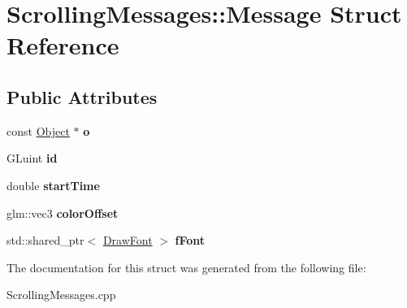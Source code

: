 \hypertarget{structScrollingMessages_1_1Message}{\section{\-Scrolling\-Messages\-:\-:\-Message \-Struct \-Reference}
\label{structScrollingMessages_1_1Message}
}
\subsection*{\-Public \-Attributes}
\begin{DoxyCompactItemize}
\item 
\hypertarget{structScrollingMessages_1_1Message_aba2bac4b6c99d108b603e5d6fc6501a5}{const \hyperlink{classObject}{\-Object} $\ast$ {\bfseries o}}\label{structScrollingMessages_1_1Message_aba2bac4b6c99d108b603e5d6fc6501a5}

\item 
\hypertarget{structScrollingMessages_1_1Message_acc669e5d61877e2be7aebb93e9d015e5}{\-G\-Luint {\bfseries id}}\label{structScrollingMessages_1_1Message_acc669e5d61877e2be7aebb93e9d015e5}

\item 
\hypertarget{structScrollingMessages_1_1Message_a255964e6c3843053aff50599d4eb857b}{double {\bfseries start\-Time}}\label{structScrollingMessages_1_1Message_a255964e6c3843053aff50599d4eb857b}

\item 
\hypertarget{structScrollingMessages_1_1Message_a5b9241d785538f508a7a257c398d124d}{glm\-::vec3 {\bfseries color\-Offset}}\label{structScrollingMessages_1_1Message_a5b9241d785538f508a7a257c398d124d}

\item 
\hypertarget{structScrollingMessages_1_1Message_af8d33f327d69d986d703747e2e9fae22}{std\-::shared\-\_\-ptr$<$ \hyperlink{classDrawFont}{\-Draw\-Font} $>$ {\bfseries f\-Font}}\label{structScrollingMessages_1_1Message_af8d33f327d69d986d703747e2e9fae22}

\end{DoxyCompactItemize}


\-The documentation for this struct was generated from the following file\-:\begin{DoxyCompactItemize}
\item 
\-Scrolling\-Messages.\-cpp\end{DoxyCompactItemize}
